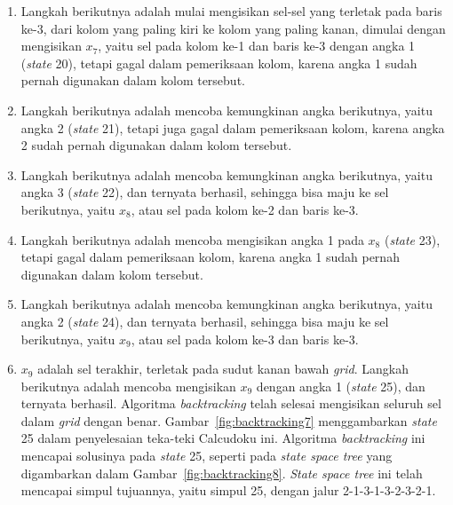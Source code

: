 \begin{enumerate}
\item Langkah berikutnya adalah mulai mengisikan sel-sel yang terletak pada baris ke-3, dari kolom yang paling kiri ke kolom yang paling kanan, dimulai dengan mengisikan \begin{math}x_7\end{math}, yaitu sel pada kolom ke-1 dan baris ke-3 dengan angka 1 (\textit{state} 20), tetapi gagal dalam pemeriksaan kolom, karena angka 1 sudah pernah digunakan dalam kolom tersebut.
\item Langkah berikutnya adalah mencoba kemungkinan angka berikutnya, yaitu angka 2 (\textit{state} 21), tetapi juga gagal dalam pemeriksaan kolom, karena angka 2 sudah pernah digunakan dalam kolom tersebut.
\item Langkah berikutnya adalah mencoba kemungkinan angka berikutnya, yaitu angka 3 (\textit{state} 22), dan ternyata berhasil, sehingga bisa maju ke sel berikutnya, yaitu \begin{math}x_8\end{math}, atau sel pada kolom ke-2 dan baris ke-3.
\item Langkah berikutnya adalah mencoba mengisikan angka 1 pada \begin{math}x_8\end{math} (\textit{state} 23), tetapi gagal dalam pemeriksaan kolom, karena angka 1 sudah pernah digunakan dalam kolom tersebut.
\item Langkah berikutnya adalah mencoba kemungkinan angka berikutnya, yaitu angka 2 (\textit{state} 24), dan ternyata berhasil, sehingga bisa maju ke sel berikutnya, yaitu \begin{math}x_9\end{math}, atau sel pada kolom ke-3 dan baris ke-3.
\item \begin{math}x_9\end{math} adalah sel terakhir, terletak pada sudut kanan bawah \textit{grid}. Langkah berikutnya adalah mencoba mengisikan \begin{math}x_9\end{math} dengan angka 1 (\textit{state} 25), dan ternyata berhasil. Algoritma \textit{backtracking} telah selesai mengisikan seluruh sel dalam \textit{grid} dengan benar. Gambar~\ref{fig:backtracking7} menggambarkan \textit{state} 25 dalam penyelesaian teka-teki Calcudoku ini. Algoritma \textit{backtracking} ini mencapai solusinya pada \textit{state} 25, seperti pada \textit{state space tree} yang digambarkan dalam Gambar~\ref{fig:backtracking8}. \textit{State space tree} ini telah mencapai simpul tujuannya, yaitu simpul 25, dengan jalur 2-1-3-1-3-2-3-2-1.


\end{enumerate}
